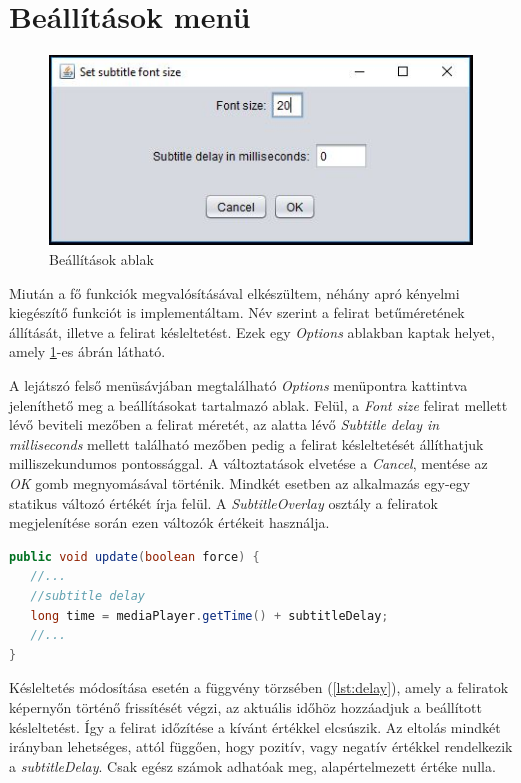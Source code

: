 \section{Beállítások menü}

\begin{figure}
\centering
  \includegraphics[width=0.8\linewidth]{images/options.jpg}
  \caption{Beállítások ablak}
  \label{fig:options}
\end{figure}

Miután a fő funkciók megvalósításával elkészültem, néhány apró kényelmi kiegészítő funkciót is implementáltam. Név szerint a felirat betűméretének állítását, illetve a felirat késleltetést. Ezek egy \textit{Options} ablakban kaptak helyet, amely \ref{fig:options}-es ábrán látható.

A lejátszó felső menüsávjában megtalálható \textit{Options} menüpontra kattintva jeleníthető meg a beállításokat tartalmazó ablak. Felül, a \textit{Font size} felirat mellett lévő beviteli mezőben a felirat méretét, az alatta lévő \textit{Subtitle delay in milliseconds} mellett található mezőben pedig a felirat késleltetését állíthatjuk milliszekundumos pontossággal. A változtatások elvetése a \textit{Cancel}, mentése az \textit{OK} gomb megnyomásával történik. Mindkét esetben az alkalmazás egy-egy statikus változó értékét írja felül. A \textit{SubtitleOverlay} osztály a feliratok megjelenítése során ezen változók értékeit használja.

\begin{lstlisting}[caption=Feliratok késleltetése, label={lst:delay}, language=java]
public void update(boolean force) {
   //...
   //subtitle delay
   long time = mediaPlayer.getTime() + subtitleDelay;
   //...
}
\end{lstlisting}

Késleltetés módosítása esetén a függvény törzsében (\ref{lst:delay}), amely a feliratok képernyőn történő frissítését végzi, az aktuális időhöz hozzáadjuk a beállított késleltetést. Így a felirat időzítése a kívánt értékkel elcsúszik. Az eltolás mindkét irányban lehetséges, attól függően, hogy pozitív, vagy negatív értékkel rendelkezik a \textit{subtitleDelay}. Csak egész számok adhatóak meg, alapértelmezett értéke nulla.


